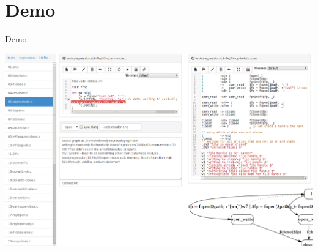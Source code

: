 \documentclass{beamer}
\begin{document}
\section{Demo}

\begin{frame}[fragile]{Demo}
\begin{center}
\includegraphics[width=\linewidth]{graphics/webapp_small.png}
\end{center}

\end{frame}



\end{document}
